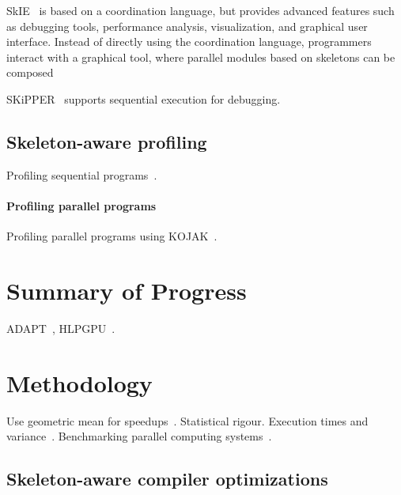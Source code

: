 SkIE~\cite{Bacci1999} is based on a coordination language, but
provides advanced features such as debugging tools, performance
analysis, visualization, and graphical user interface. Instead of
directly using the coordination language, programmers interact with a
graphical tool, where parallel modules based on skeletons can be
composed

SKiPPER~\cite{Cezeaux1999} supports sequential execution for
debugging.


\subsection{Skeleton-aware profiling}

Profiling sequential programs~\cite{Ball1994}.

\paragraph{Profiling parallel programs} Profiling parallel programs
using KOJAK~\cite{Mohr2003}.


\section{Summary of Progress}

ADAPT~\cite{Cummins2015a}, HLPGPU~\cite{Cummins2016}.


\section{Methodology}

Use geometric mean for speedups~\cite{Fleming1986}. Statistical
rigour\cite{Georges2007}. Execution times and
variance~\cite{Box}. Benchmarking parallel computing
systems~\cite{Belli2015}.


\subsection{Skeleton-aware compiler optimizations}


